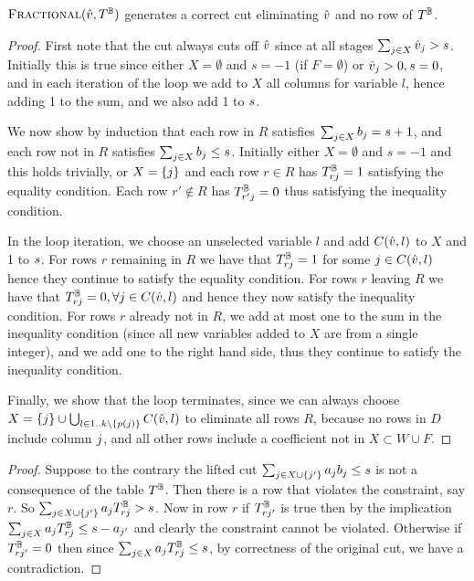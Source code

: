 \documentclass[a4paper,UKenglish,cleveref,autoref,thm-restate]{lipics-v2021}
\begin{document}
\begin{theorem}
    $\textsc{Fractional}(\hat{v}, T^{\mathbb{B}})$ generates a correct cut eliminating $\hat{v}$ and no row of $T^{\mathbb{B}}$.
    \begin{proof}
     First note that the cut always cuts off $\hat{v}$ since at all stages 
     $\sum_{j \in X} \hat{v}_j > s$.
     Initially this is true since either
     $X = \emptyset$ and $s = -1$ (if $F = \emptyset$) or
     $\hat{v}_j > 0, s = 0$, and in each iteration of the loop
     we add to $X$ all columns for variable $l$, hence adding 1 to the sum, and we also add 1 to $s$. 

     We now show by induction that each row in $R$ satisfies $\sum_{j \in X} b_j  = s+1$, and each row not in $R$ satisfies $\sum_{j \in X} b_j \leq s$. 
     Initially either $X = \emptyset$ and $s = -1$ and this holds trivially, or     
     $X = \{j\}$ and each row $r \in R $ has $T^{\mathbb{B}}_{rj} = 1$ satisfying the equality condition.
     Each row $r' \not \in R$ has $T^{\mathbb{B}}_{r'j} = 0$ thus satisfying the inequality condition. 

     In the loop iteration, we choose an unselected variable $l$ and add $C(\hat{v},l)$ to $X$ and 1 to $s$. 
     For rows $r$ remaining in $R$ we have that $T^{\mathbb{B}}_{rj} = 1$ for some $j \in C(\hat{v},l)$ hence they continue to satisfy the equality condition.
     For rows $r$ leaving $R$ we have that $T^{\mathbb{B}}_{rj} = 0, \forall j \in C(\hat{v},l)$ and hence they now satisfy the inequality condition. 
     For rows $r$ already not in $R$, we add at most one to the sum in the inequality condition (since all new variables added to $X$ are from a single integer), and we add one to the right hand side, thus they continue to satisfy the inequality condition.

     Finally, we show that the loop terminates, since we can always choose $X = \{j\} \cup \bigcup_{l \in 1..k \setminus \{p(j)\}} C(\hat{v},l)$ to eliminate all rows $R$, because no rows in $D$ include column $j$, and all other rows include a coefficient not in $X \subset W \cup F$. 
    \end{proof}
\end{theorem}

\setcounter{theorem}{12}
\begin{theorem}
\cutliftThm
\begin{proof}
Suppose to the contrary the lifted cut $\sum_{j \in X \cup \{j'\}} a_j b_j \leq s$ 
is not a consequence of the table $T^{\mathbb{B}}$.
Then there is a row that violates the constraint, say $r$.  
So $\sum_{j \in X \cup \{j'\}} a_j T^{\mathbb{B}}_{rj} > s$.
Now in row $r$ if $T^{\mathbb{B}}_{rj'}$ is true then by the implication
$\sum_{j \in X} a_j T^{\mathbb{B}}_{rj} \leq s - a_{j'}$ and 
clearly the constraint cannot be violated.
Otherwise if $T^{\mathbb{B}}_{rj'} = 0$ then since $\sum_{j \in X} a_{j} T^{\mathbb{B}}_{rj} \leq s$, by correctness of the original cut, we have a contradiction.
\end{proof}
\end{theorem}
\end{document}

